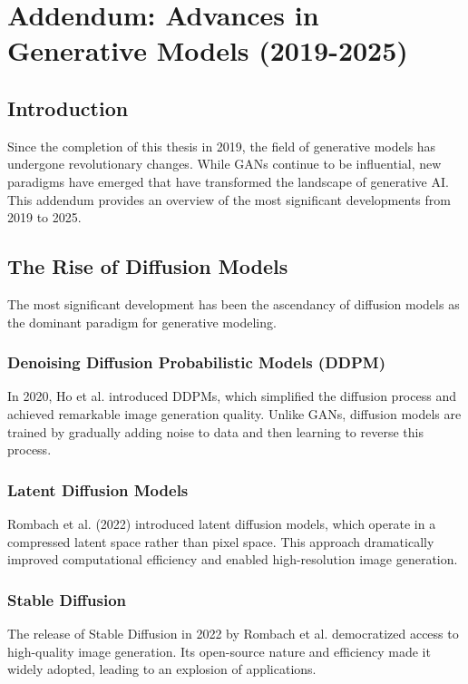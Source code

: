 \section*{Addendum: Advances in Generative Models (2019-2025)}

\subsection*{Introduction}

Since the completion of this thesis in 2019, the field of generative models has undergone revolutionary changes. While GANs continue to be influential, new paradigms have emerged that have transformed the landscape of generative AI. This addendum provides an overview of the most significant developments from 2019 to 2025.

\subsection*{The Rise of Diffusion Models}

The most significant development has been the ascendancy of diffusion models as the dominant paradigm for generative modeling.

\subsubsection*{Denoising Diffusion Probabilistic Models (DDPM)}
In 2020, Ho et al. introduced DDPMs, which simplified the diffusion process and achieved remarkable image generation quality. Unlike GANs, diffusion models are trained by gradually adding noise to data and then learning to reverse this process.

\subsubsection*{Latent Diffusion Models}
Rombach et al. (2022) introduced latent diffusion models, which operate in a compressed latent space rather than pixel space. This approach dramatically improved computational efficiency and enabled high-resolution image generation.

\subsubsection*{Stable Diffusion}
The release of Stable Diffusion in 2022 by Rombach et al. democratized access to high-quality image generation. Its open-source nature and efficiency made it widely adopted, leading to an explosion of applications.

